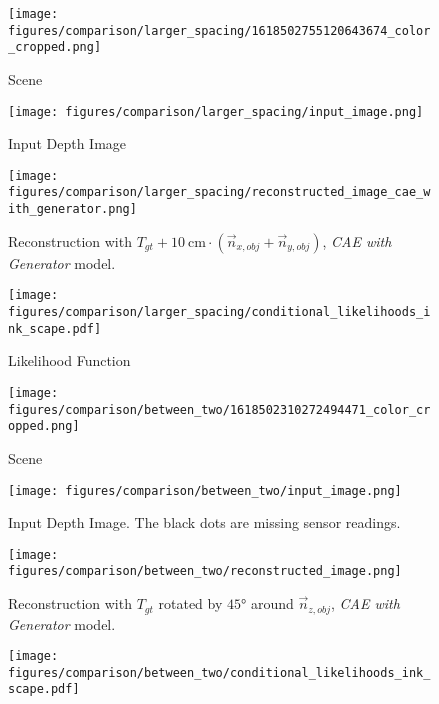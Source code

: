 \documentclass[letterpaper, 10 pt, journal, twoside]{ieeetran}  %
\begin{document}
\begin{figure*}[htp]
	\centering
	\begin{subfigure}[t]{0.245\textwidth}
		\texttt{[image: figures/comparison/larger\_spacing/1618502755120643674\_color\_cropped.png]}
		\caption{Scene}
		\label{fig:exp_a_scene}
	\end{subfigure}
	\hfill
	\begin{subfigure}[t]{0.245\textwidth}
		\texttt{[image: figures/comparison/larger\_spacing/input\_image.png]}
		\caption{Input Depth Image}
		\label{fig:exp_a_input}
	\end{subfigure}
    \hfill
    \begin{subfigure}[t]{0.245\textwidth}
		\texttt{[image: figures/comparison/larger\_spacing/reconstructed\_image\_cae\_with\_generator.png]}
		\caption{Reconstruction with $T_{gt} + \SI{10}{\centi\meter} \cdot (\vec{n}_{x, obj} + \vec{n}_{y, obj})$, \textit{CAE with Generator} model.}
		\label{fig:exp_a_reconstruction}
	\end{subfigure}
	\hfill	
	\begin{subfigure}[t]{0.245\textwidth}
		\texttt{[image: figures/comparison/larger\_spacing/conditional\_likelihoods\_ink\_scape.pdf]}
		\caption{Likelihood Function}
		\label{fig:exp_a_conditional_likelihood_cae}
	\end{subfigure}
	\hfill
	\begin{subfigure}[t]{0.245\textwidth}
		\texttt{[image: figures/comparison/between\_two/1618502310272494471\_color\_cropped.png]}
		\caption{Scene}
		\label{fig:exp_b_scene}
	\end{subfigure}
	\hfill
	\begin{subfigure}[t]{0.245\textwidth}
		\texttt{[image: figures/comparison/between\_two/input\_image.png]}
		\caption{Input Depth Image. The black dots are missing sensor readings.}
		\label{fig:exp_b_input}
	\end{subfigure}
	\hfill
	\begin{subfigure}[t]{0.245\textwidth}
		\texttt{[image: figures/comparison/between\_two/reconstructed\_image.png]}
		\caption{Reconstruction with $T_{gt}$ rotated by $\ang{45}$ around $\vec{n}_{z, obj}$, \textit{CAE with Generator} model.}
		\label{fig:exp_b_reconstruction}
	\end{subfigure}
	\hfill
	\begin{subfigure}[t]{0.245\textwidth}
		\texttt{[image: figures/comparison/between\_two/conditional\_likelihoods\_ink\_scape.pdf]}

\end{subfigure}
\end{figure*}
\end{document}
